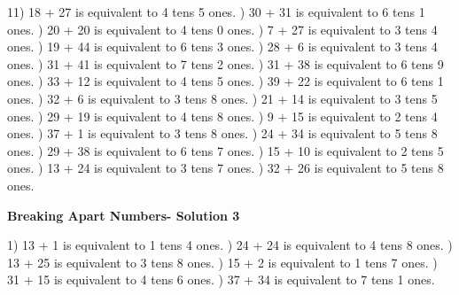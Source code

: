 \documentclass{article}%
\begin{document}
11) 18 + 27 is equivalent to 4 tens 5 ones.%
) 30 + 31 is equivalent to 6 tens 1 ones.%
) 20 + 20 is equivalent to 4 tens 0 ones.%
) 7 + 27 is equivalent to 3 tens 4 ones.%
) 19 + 44 is equivalent to 6 tens 3 ones.%
) 28 + 6 is equivalent to 3 tens 4 ones.%
) 31 + 41 is equivalent to 7 tens 2 ones.%
) 31 + 38 is equivalent to 6 tens 9 ones.%
) 33 + 12 is equivalent to 4 tens 5 ones.%
) 39 + 22 is equivalent to 6 tens 1 ones.%
) 32 + 6 is equivalent to 3 tens 8 ones.%
) 21 + 14 is equivalent to 3 tens 5 ones.%
) 29 + 19 is equivalent to 4 tens 8 ones.%
) 9 + 15 is equivalent to 2 tens 4 ones.%
) 37 + 1 is equivalent to 3 tens 8 ones.%
) 24 + 34 is equivalent to 5 tens 8 ones.%
) 29 + 38 is equivalent to 6 tens 7 ones.%
) 15 + 10 is equivalent to 2 tens 5 ones.%
) 13 + 24 is equivalent to 3 tens 7 ones.%
) 32 + 26 is equivalent to 5 tens 8 ones.%
\newline%
\newpage%
\large%
\begin{center}%
\textbf{Breaking Apart Numbers- Solution 3}%
\newline%
\end{center} \normalsize%
1) 13 + 1 is equivalent to 1 tens 4 ones.%
) 24 + 24 is equivalent to 4 tens 8 ones.%
) 13 + 25 is equivalent to 3 tens 8 ones.%
) 15 + 2 is equivalent to 1 tens 7 ones.%
) 31 + 15 is equivalent to 4 tens 6 ones.%
) 37 + 34 is equivalent to 7 tens 1 ones.%
\end{document}

